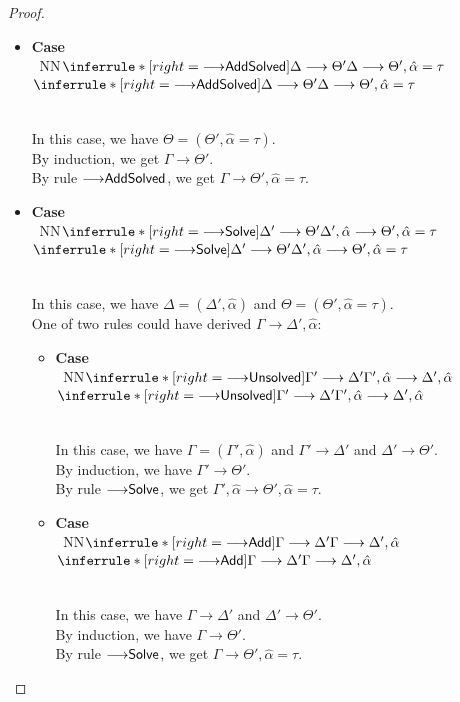 \documentclass[a4paper]{article}
\gdef\xxDerivationProofCaseColor{N}
\newcommand{\DerivationProofCase}[3]{\smallskip
     \item \parbox[t]{100ex}{\textbf{Case } \\[-0.5em]
       $~$\hspace{5ex}
       \if\xxDerivationProofCaseColor N\ensuremath{\Infer{#1}{#2}{#3}}
       \else \colorbox{\xxDerivationProofCaseColor}{\ensuremath{\Infer{#1}{#2}{#3}}}\fi }\nopagebreak \\[-0.8ex]
  }
\newcommand{\Infer}[3]{\inferrule*[right={\text{\strut#1}}]{{}#2\mathstrut}{{}#3\mathstrut}}
\newcommand{\extendssym}{\longrightarrow}
\newcommand{\extends}[2]{{#1} \extendssym {#2}}
\newcommand{\substextend}[2]{\extends{#1}{#2}}
\newcommand{\ahat}{\hat{\alpha}}
\newcommand{\rulename}[1]{\text{\normalfont\textsf{#1}}}
\newcommand{\substextendrulename}[1]{\ensuremath{{\extendssym}{\rulename{#1}}}\xspace}
\newcommand{\substextendEE}{\substextendrulename{Unsolved}}
\newcommand{\substextendSolve}{\substextendrulename{Solve}}
\newcommand{\substextendAdd}{\substextendrulename{Add}}
\newcommand{\substextendAddSolved}{\substextendrulename{AddSolved}}
\begin{document}
\begin{proof}
\begin{itemize}
  \DerivationProofCase{\substextendAddSolved}
                      {\substextend{\Delta}{\Theta'}}
                      {\substextend{\Delta}{\Theta', \ahat=\tau}}

      In this case, we have $\Theta = (\Theta', \ahat=\tau)$. \\
      By induction, we get $\substextend{\Gamma}{\Theta'}$. \\
      By rule \substextendAddSolved, we get $\substextend{\Gamma}{\Theta', \ahat=\tau}$. 

  \DerivationProofCase{\substextendSolve}
                      {\substextend{\Delta'}{\Theta'}}
                      {\substextend{\Delta', \ahat}{\Theta', \ahat=\tau}}

      In this case, we have $\Delta = (\Delta', \ahat)$ and $\Theta = (\Theta', \ahat=\tau)$. \\
      One of two rules could have derived $\substextend{\Gamma}{\Delta', \ahat}$:

          \begin{itemize}
              \DerivationProofCase{\substextendEE}
                                  {\substextend{\Gamma'}{\Delta'}}
                                  {\substextend{\Gamma',\ahat}{\Delta',\ahat}}

                   In this case, we have $\Gamma = (\Gamma', \ahat)$
                     and $\substextend{\Gamma'}{\Delta'}$
                     and $\substextend{\Delta'}{\Theta'}$. \\
                   By induction, we have $\substextend{\Gamma'}{\Theta'}$. \\
                   By rule \substextendSolve, we get $\substextend{\Gamma', \ahat}{\Theta', \ahat=\tau}$. 

               \DerivationProofCase{\substextendAdd}
                                   {\substextend{\Gamma}{\Delta'}}
                                   {\substextend{\Gamma}{\Delta',\ahat}}

                   In this case, we have $\substextend{\Gamma}{\Delta'}$ and $\substextend{\Delta'}{\Theta'}$. \\
                   By induction, we have $\substextend{\Gamma}{\Theta'}$. \\
                   By rule \substextendSolve, we get $\substextend{\Gamma}{\Theta', \ahat=\tau}$. 
           \qedhere
\end{itemize}
\end{itemize}
\end{proof}
\end{document}
